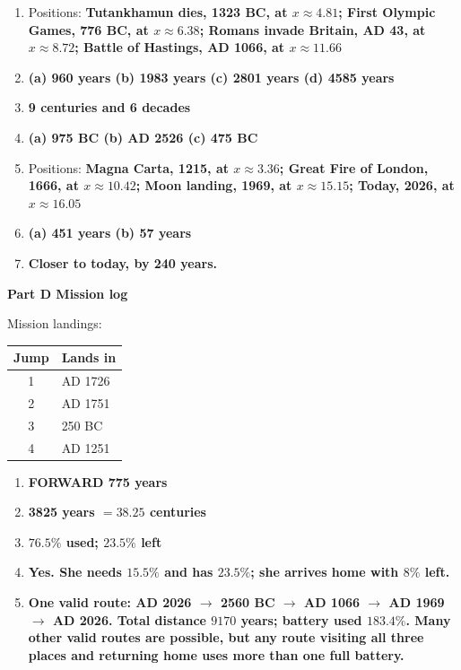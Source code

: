 \documentclass[11pt,a4paper]{article}
\newcommand{\banner}[1]{{\color{ttdark}\large\bfseries #1}\par\vspace{-4pt}{\color{ttdark}\rule{\linewidth}{1pt}}\par\vspace{2pt}}
\newcommand{\ans}[1]{\textcolor{ttaccent}{\bfseries #1}}
\begin{document}
\begin{enumerate}[label=\textbf{C\arabic*.}, leftmargin=*, itemsep=3pt]
\item Positions: \ans{Tutankhamun dies, 1323 BC, at \(x\approx4.81\); First Olympic Games, 776 BC, at \(x\approx6.38\); Romans invade Britain, AD 43, at \(x\approx8.72\); Battle of Hastings, AD 1066, at \(x\approx11.66\)}
\item \ans{(a) 960 years \quad (b) 1983 years \quad (c) 2801 years \quad (d) 4585 years}
\item \ans{9 centuries and 6 decades}
\item \ans{(a) 975 BC \quad (b) AD 2526 \quad (c) 475 BC}
\item Positions: \ans{Magna Carta, 1215, at \(x\approx3.36\); Great Fire of London, 1666, at \(x\approx10.42\); Moon landing, 1969, at \(x\approx15.15\); Today, 2026, at \(x\approx16.05\)}
\item \ans{(a) 451 years \quad (b) 57 years}
\item \ans{Closer to today, by 240 years.}
\end{enumerate}

\banner{Part D \quad Mission log}

Mission landings:
\begin{center}
\begin{tabular}{@{}cl@{}}
\toprule
Jump & Lands in\\
\midrule
1 & AD 1726\\
2 & AD 1751\\
3 & 250 BC\\
4 & AD 1251\\
\bottomrule
\end{tabular}
\end{center}

\begin{enumerate}[label=\textbf{D\arabic*.}, leftmargin=*, itemsep=3pt]
\item \ans{FORWARD 775 years}
\item \ans{3825 years $=38.25$ centuries}
\item \ans{$76.5\%$ used; $23.5\%$ left}
\item \ans{Yes. She needs $15.5\%$ and has $23.5\%$; she arrives home with $8\%$ left.}
\item \ans{One valid route: AD 2026 $\to$ 2560 BC $\to$ AD 1066 $\to$ AD 1969 $\to$ AD 2026. Total distance $9170$ years; battery used $183.4\%$. Many other valid routes are possible, but any route visiting all three places and returning home uses more than one full battery.}
\end{enumerate}
\end{document}
